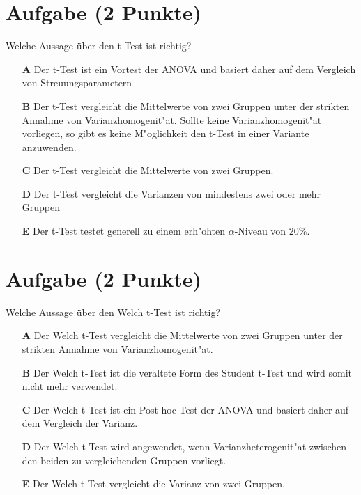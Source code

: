\documentclass[a4paper, 10pt]{scrartcl}\usepackage[]{graphicx}\usepackage[]{xcolor}
\begin{document}
\section{Aufgabe \hfill (2 Punkte)}

Welche Aussage {\"u}ber den t-Test ist richtig?



\begin{enumerate}
\item [\textbf{A} \msquare] Der t-Test ist ein Vortest der ANOVA und basiert daher auf dem Vergleich von Streuungsparametern
\item [\textbf{B} \msquare] Der t-Test vergleicht die Mittelwerte von zwei Gruppen unter der strikten Annahme von Varianzhomogenit{"a}t. Sollte keine Varianzhomogenit{"a}t vorliegen, so gibt es keine M{"o}glichkeit den t-Test in einer Variante anzuwenden.
\item [\textbf{C} \msquare] Der t-Test vergleicht die Mittelwerte von zwei Gruppen.
\item [\textbf{D} \msquare] Der t-Test vergleicht die Varianzen von mindestens zwei oder mehr Gruppen
\item [\textbf{E} \msquare] Der t-Test testet generell zu einem erh{"o}hten $\alpha$-Niveau von 20\%.
\end{enumerate}

\section{Aufgabe \hfill (2 Punkte)}

Welche Aussage {\"u}ber den Welch t-Test ist richtig?



\begin{enumerate}
\item [\textbf{A} \msquare] Der Welch t-Test vergleicht die Mittelwerte von zwei Gruppen unter der strikten Annahme von Varianzhomogenit{"a}t.
\item [\textbf{B} \msquare] Der Welch t-Test ist die veraltete Form des Student t-Test und wird somit nicht mehr verwendet.
\item [\textbf{C} \msquare] Der Welch t-Test ist ein Post-hoc Test der ANOVA und basiert daher auf dem Vergleich der Varianz.
\item [\textbf{D} \msquare] Der Welch t-Test wird angewendet, wenn Varianzheterogenit{"a}t zwischen den beiden zu vergleichenden Gruppen vorliegt.
\item [\textbf{E} \msquare] Der Welch t-Test vergleicht die Varianz von zwei Gruppen.
\end{enumerate}
\end{document}
